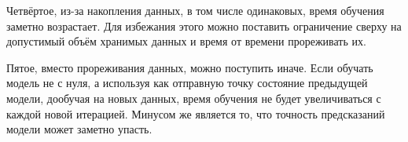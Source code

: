 \documentclass[12pt]{article}
\begin{document}
Четвёртое, из-за накопления данных, в том числе одинаковых, время обучения заметно возрастает. Для избежания этого можно поставить ограничение сверху на допустимый объём хранимых данных и время от времени прореживать их.

Пятое, вместо прореживания данных, можно поступить иначе. Если обучать модель не с нуля, а используя как отправную точку состояние предыдущей модели, дообучая на новых данных, время обучения не будет увеличиваться с каждой новой итерацией. Минусом же является то, что точность предсказаний модели может заметно упасть.



\end{document}
